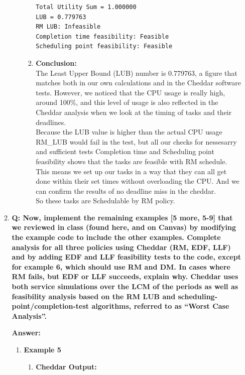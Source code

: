 \documentclass[a4paper,11pt]{article}%
\newenvironment{qanda}{\setlength{\parindent}{0pt}}{\bigskip}
\newcommand{\Q}{\bigskip\bfseries Q: }
\newcommand{\A}{\par\textbf{Answer: } \normalfont}
\begin{document}
\begin{qanda}
\begin{enumerate}
\begin{enumerate}
\begin{enumerate}
\begin{enumerate}
\begin{verbatim}
Total Utility Sum = 1.000000
LUB = 0.779763
RM LUB: Infeasible
Completion time feasibility: Feasible
Scheduling point feasibility: Feasible
										\end{verbatim}
						            \item \textbf{Conclusion:}\\
						                  The Least Upper Bound (LUB) number is 0.779763, a figure that matches both in our own calculations and in the Cheddar software tests. However, we noticed that the CPU usage is really high, around 100\%, and this level of usage is also reflected in the Cheddar analysis when we look at the timing of tasks and their deadlines.\\

						                  Because the LUB value is higher than the actual CPU usage RM\_LUB would fail in the test, but all our checks for nessesarry and sufficient tests Completion time and Scheduling point feasibility shows that the tasks are feasible with RM schedule. This means we set up our tasks in a way that they can all get done within their set times without overloading the CPU. And we can confirm the results of no deadline miss in the cheddar.\\

						                  So these tasks are Schedulable by RM policy.
					            \end{enumerate}
				      \end{enumerate}

				\item \Q Now, implement the remaining examples [5 more, 5-9] that we reviewed in class (found
				      here, and on Canvas) by modifying the example code to include the other examples.
				      Complete analysis for all three policies using Cheddar (RM, EDF, LLF) and by adding
				      EDF and LLF feasibility tests to the code, except for example 6, which should use RM
				      and DM. In cases where RM fails, but EDF or LLF succeeds, explain why. Cheddar
				      uses both service simulations over the LCM of the periods as well as feasibility analysis
				      based on the RM LUB and scheduling-point/completion-test algorithms, referred to as
				      “Worst Case Analysis”.

				      \A

				      \begin{enumerate}
					      \item \textbf{Example 5}
					            \begin{enumerate}
						            \item \textbf{Cheddar Output:}\\


\end{enumerate}
\end{enumerate}
\end{enumerate}
\end{enumerate}
\end{qanda}
\end{document}
